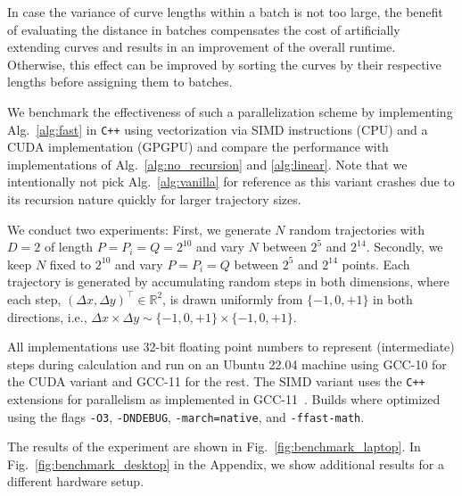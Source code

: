 In case the variance of curve lengths within a batch is not too large, the benefit of evaluating the distance in batches compensates the cost of artificially extending curves and results in an improvement of the overall runtime.
Otherwise, this effect can be improved by sorting the curves by their respective lengths before assigning them to batches.

We benchmark the effectiveness of such a parallelization scheme by implementing Alg.~\ref{alg:fast} in \texttt{C++} using vectorization via SIMD instructions (CPU) and a CUDA implementation (GPGPU) and compare the performance with implementations of Alg.~\ref{alg:no_recursion} and \ref{alg:linear}.
Note that we intentionally not pick Alg.~\ref{alg:vanilla} for reference as this variant crashes due to its recursion nature quickly for larger trajectory sizes.

We conduct two experiments:
First, we generate $N$ random trajectories with $D=2$ of length $P = P_i = Q = 2^{10}$ and vary $N$ between $2^5$ and $2^{14}$.
Secondly, we keep $N$ fixed to $2^{10}$ and vary $P = P_i = Q$ between $2^5$ and $2^{14}$ points.
Each trajectory is generated by accumulating random steps in both dimensions, where each step, $(\Delta x, \Delta y)^\top \in \mathbb{R}^2$, is drawn uniformly from $\{-1, 0, +1\}$ in both directions, i.e., $\Delta x \times \Delta y \sim \{ -1, 0, +1 \} \times \{ -1, 0, +1 \}$.

All implementations use 32-bit floating point numbers to represent (intermediate) steps during calculation and run on an Ubuntu 22.04 machine using GCC-10 for the CUDA variant and GCC-11 for the rest.
The SIMD variant uses the \texttt{C++} extensions for parallelism as implemented in GCC-11~\citep{N4808}.
Builds where optimized using the flags \texttt{-O3}, \texttt{-DNDEBUG}, \texttt{-march=native}, and \texttt{-ffast-math}.

The results of the experiment are shown in Fig.~\ref{fig:benchmark_laptop}.
In Fig.~\ref{fig:benchmark_desktop} in the Appendix, we show additional results for a different hardware setup.

